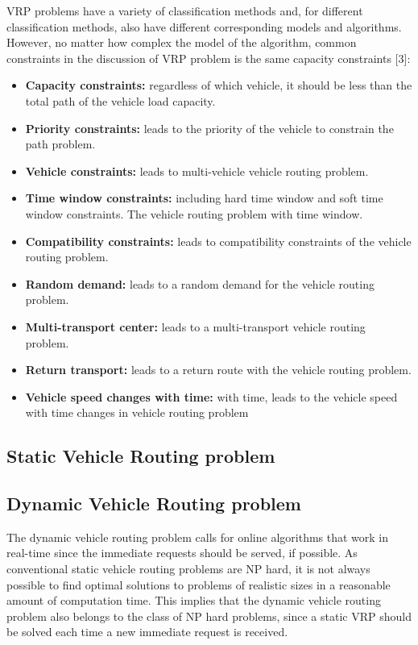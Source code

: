VRP problems have a variety of classification methods and, for different classification methods, also have different corresponding models and algorithms. However, no matter how complex the model of the algorithm, common constraints in the discussion of VRP problem is the same capacity constraints [3]:

\begin{itemize}
    \item \textbf{Capacity constraints:} regardless of which vehicle, it should be less than the total path of the vehicle load capacity. 
    \item \textbf{Priority constraints:} leads to the priority of the vehicle to constrain the path problem.
    \item \textbf{Vehicle constraints:} leads to multi-vehicle vehicle routing problem.
    \item \textbf{Time window constraints:} including hard time window and soft time window constraints. The vehicle routing problem with time window.
    \item \textbf{Compatibility constraints:} leads to compatibility constraints of the vehicle routing problem.
    \item \textbf{Random demand:} leads to a random demand for the vehicle routing problem.
    \item \textbf{Multi-transport center:} leads to a multi-transport vehicle routing problem.
    \item \textbf{Return transport:} leads to a return route with the vehicle routing problem.
    \item \textbf{Vehicle speed changes with time:} with time, leads to the vehicle speed with time changes in vehicle routing problem
\end{itemize}

\subsection{Static Vehicle Routing problem}

\subsection{Dynamic Vehicle Routing problem}

The dynamic vehicle routing problem calls for online algorithms that work in real-time since the immediate requests should be served, if possible. As conventional static vehicle routing problems are NP hard, it is not always possible to find optimal solutions to problems of realistic sizes in a reasonable amount of computation time. This implies that the dynamic vehicle routing problem also belongs to the class of NP hard problems,
since a static VRP should be solved each time a new immediate request is received.























